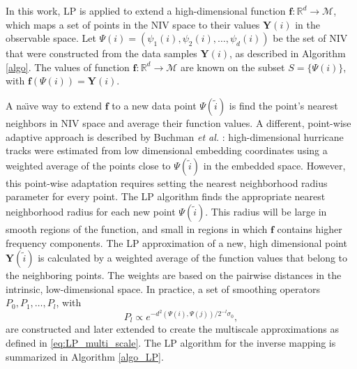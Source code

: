 In this work, LP is applied to extend a high-dimensional function $\mathbf{f}:\mathbb{R}^d \rightarrow \mathcal{M}$,
which maps a set of points in the NIV space to their values $\mathbf{Y}(i)$ in the observable space.
%
Let $\Psi(i) = \left(\psi_1(i),\psi_2(i),\ldots,\psi_d(i)\right)$ be the set of NIV that were constructed from the data samples $\mathbf{Y}(i)$, as described in Algorithm \ref{algo}.
%
The values of function $\mathbf{f}:\mathbb{R}^d \rightarrow \mathcal{M}$ are known on the subset $S = \{\Psi(i)\}$, with $\mathbf{f}(\Psi(i)) = \mathbf{Y}(i)$.

A na\"{\i}ve way to extend $\mathbf{f}$ to a new data point $\Psi(\tilde{i})$ is find the point's nearest neighbors in NIV space and average their function values.
%
A different, point-wise adaptive approach is described by Buchman {\em et al.} \cite{buchman2011high}:
high-dimensional hurricane tracks were estimated from low dimensional embedding coordinates using a weighted average of the points close to $\Psi(\tilde{i})$ in the embedded space.
%
However, this point-wise adaptation requires setting the nearest neighborhood radius parameter for every point.
%
The LP algorithm finds the appropriate nearest neighborhood radius for each new point $\Psi(\tilde{i})$.
%
This radius will be large in smooth regions of the function, and small in regions in which $\mathbf{f}$ contains higher frequency components.
%
The LP approximation of a new, high dimensional point $\mathbf{Y}(\tilde{i})$ is calculated by a weighted average of the function values that belong to the neighboring points.
%
The weights are based on the pairwise distances in the intrinsic, low-dimensional space.
%
In practice, a set of smoothing operators $P_0, P_1, \ldots, P_l$, with
\begin{equation} \label{eq:LP_multi_scale_app}
P_l \propto e^{-d^2(\Psi(i),\Psi(j)) / 2^{-l} \sigma_0},
\end{equation}
are constructed and later extended to create the multiscale approximations as defined in \eqref{eq:LP_multi_scale}.
%
The LP algorithm for the inverse mapping is summarized in Algorithm \ref{algo_LP}.

